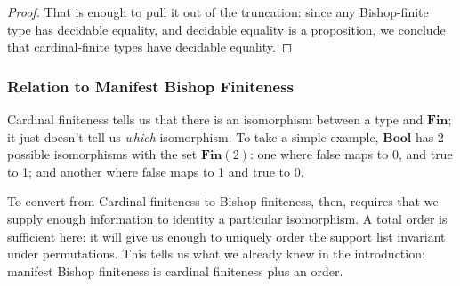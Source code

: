 \begin{refsection}
\begin{proof}
  That is enough to pull it out of the truncation: since any Bishop-finite type
  has decidable equality, and decidable equality is a proposition, we conclude
  that cardinal-finite types have decidable equality.
\end{proof}
\subsubsection{Relation to Manifest Bishop Finiteness}
Cardinal finiteness tells us that there is an isomorphism between a type and
\(\mathbf{Fin}\); it just doesn't tell us \emph{which} isomorphism.
To take a simple example, \(\mathbf{Bool}\) has 2 possible isomorphisms with the
set \(\mathbf{Fin}(2)\): one where false maps to 0, and true to 1; and another
where false maps to 1 and true to 0.

To convert from Cardinal finiteness to Bishop finiteness, then, requires that we
supply enough information to identity a particular isomorphism.
A total order is sufficient here: it will give us enough to uniquely order the
support list invariant under permutations.
This tells us what we already knew in the introduction: manifest Bishop
finiteness is cardinal finiteness plus an order.


\end{refsection}
